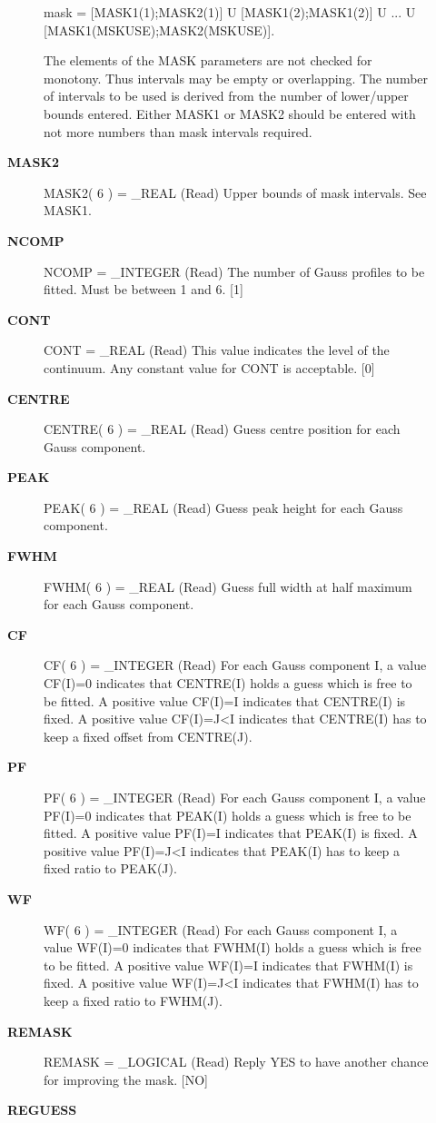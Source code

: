 \begin{description}
\begin{description}
      mask = [MASK1(1);MASK2(1)] U [MASK1(2);MASK1(2)]
           U ...
           U [MASK1(MSKUSE);MASK2(MSKUSE)].

   The elements of the MASK parameters are not checked for
   monotony. Thus intervals may be empty or overlapping. The
   number of intervals to be used is derived from the number of
   lower/upper bounds entered. Either MASK1 or MASK2 should be
   entered with not more numbers than mask intervals required.
\item [{\bf MASK2}]
MASK2( 6 ) = _REAL (Read)
   Upper bounds of mask intervals. See MASK1.
\item [{\bf NCOMP}]
NCOMP = _INTEGER (Read)
   The number of Gauss profiles to be fitted. Must be between 1
   and 6. [1]
\item [{\bf CONT}]
CONT = _REAL (Read)
   This value indicates the level of the continuum. Any constant
   value for CONT is acceptable. [0]
\item [{\bf CENTRE}]
CENTRE( 6 ) = _REAL (Read)
   Guess centre position for each Gauss component.
\item [{\bf PEAK}]
PEAK( 6 ) = _REAL (Read)
   Guess peak height for each Gauss component.
\item [{\bf FWHM}]
FWHM( 6 ) = _REAL (Read)
   Guess full width at half maximum for each Gauss component.
\item [{\bf CF}]
CF( 6 ) = _INTEGER (Read)
   For each Gauss component I, a value CF(I)=0 indicates that
   CENTRE(I) holds a guess which is free to be fitted.
   A positive value CF(I)=I indicates that CENTRE(I) is fixed.
   A positive value CF(I)=J<I indicates that CENTRE(I) has to
   keep a fixed offset from CENTRE(J).
\item [{\bf PF}]
PF( 6 ) = _INTEGER (Read)
   For each Gauss component I, a value PF(I)=0 indicates that
   PEAK(I) holds a guess which is free to be fitted.
   A positive value PF(I)=I indicates that PEAK(I) is fixed.
   A positive value PF(I)=J<I indicates that PEAK(I) has to
   keep a fixed ratio to PEAK(J).
\item [{\bf WF}]
WF( 6 ) = _INTEGER (Read)
   For each Gauss component I, a value WF(I)=0 indicates that
   FWHM(I) holds a guess which is free to be fitted.
   A positive value WF(I)=I indicates that FWHM(I) is fixed.
   A positive value WF(I)=J<I indicates that FWHM(I) has to
   keep a fixed ratio to FWHM(J).
\item [{\bf REMASK}]
REMASK = _LOGICAL (Read)
   Reply YES to have another chance for improving the mask.
   [NO]
\item [{\bf REGUESS}]

\end{description}
\end{description}
